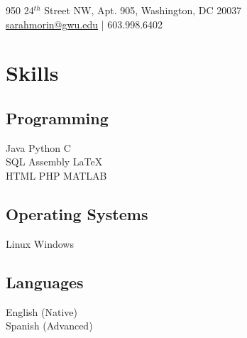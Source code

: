 \documentclass[]{deedy-resume-openfont}
\begin{document}
%
%
\lastupdated

%
%
{   950 24$^{th}$ Street NW, Apt. 905, Washington, DC 20037 \\
\href{mailto:sarahmorin@gwu.edu}{sarahmorin@gwu.edu} | 603.998.6402 }

%
%

\begin{minipage}[t]{0.33\textwidth}

        \section{Skills}
        \subsection{Programming}
        Java \textbullet{}  Python \textbullet{} C \\
        SQL \textbullet{} Assembly \textbullet{} \LaTeX\ \\
        HTML \textbullet{} PHP \textbullet{} MATLAB \\
        \sectionsep
        \subsection{Operating Systems}
        Linux \textbullet{} Windows \\
        \sectionsep
        \subsection{Languages}
        English (Native) \\
        Spanish (Advanced)\\
        \sectionsep



\end{minipage}
\end{document}

